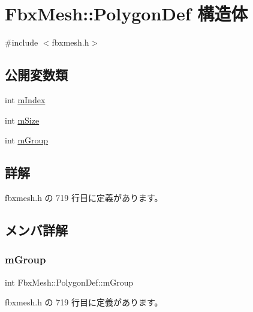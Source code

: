 \hypertarget{struct_fbx_mesh_1_1_polygon_def}{}\section{Fbx\+Mesh\+:\+:Polygon\+Def 構造体}
\label{struct_fbx_mesh_1_1_polygon_def}


{\ttfamily \#include $<$fbxmesh.\+h$>$}

\subsection*{公開変数類}
\begin{DoxyCompactItemize}
\item 
int \hyperlink{struct_fbx_mesh_1_1_polygon_def_af511988f3d8e9db28dda49efeb75cd94}{m\+Index}
\item 
int \hyperlink{struct_fbx_mesh_1_1_polygon_def_a77222b3c2e42261e765b21a871c4c066}{m\+Size}
\item 
int \hyperlink{struct_fbx_mesh_1_1_polygon_def_ae413c624e60c217fc94e4801c6ee7440}{m\+Group}
\end{DoxyCompactItemize}


\subsection{詳解}


 fbxmesh.\+h の 719 行目に定義があります。



\subsection{メンバ詳解}
\mbox{\label{struct_fbx_mesh_1_1_polygon_def_ae413c624e60c217fc94e4801c6ee7440}} 
\subsubsection{\texorpdfstring{m\+Group}{mGroup}}
{\footnotesize\ttfamily int Fbx\+Mesh\+::\+Polygon\+Def\+::m\+Group}



 fbxmesh.\+h の 719 行目に定義があります。

\mbox{\label{struct_fbx_mesh_1_1_polygon_def_af511988f3d8e9db28dda49efeb75cd94}} 

